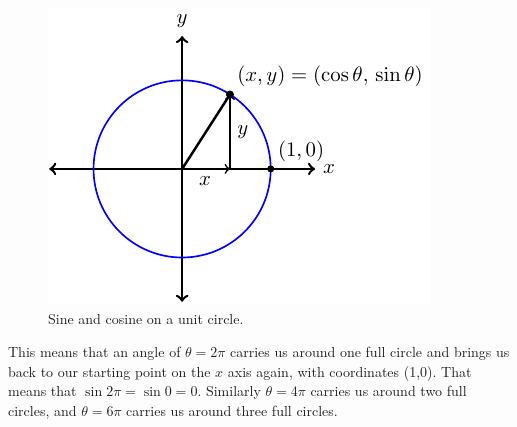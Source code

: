 \begin{figure}
    \begin{center}
        \includegraphics[width=0.4\columnwidth]{figures/0-5-fig4.pdf}
    \end{center}
    \caption{Sine and cosine on a unit circle.}
    \label{fig:0.5.unit}
\end{figure}


This means that an angle of $\theta = 2 \pi$ carries us around one full circle and brings
us back to our starting point on the $x$ axis again, with coordinates (1,0).  That means
that $\sin 2 \pi = \sin 0 = 0$.  Similarly $\theta = 4 \pi$ carries us around two full
circles, and $\theta = 6 \pi$ carries us around three full circles. 

